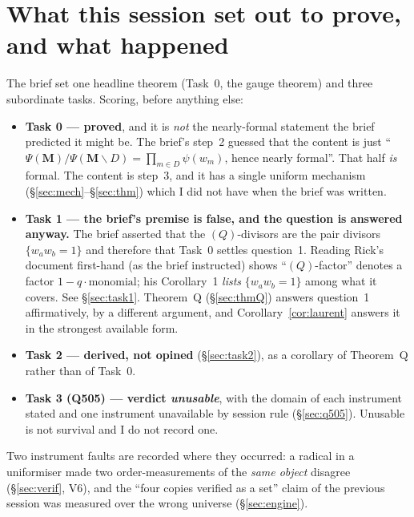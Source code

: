 \documentclass[11pt]{article}
\theoremstyle{definition}
\newcommand{\bM}{\mathbf{M}}
\newcommand{\sm}{\smallsetminus}
\begin{document}
\tableofcontents

\section{What this session set out to prove, and what happened}

The brief set one headline theorem (Task~0, the gauge theorem) and three
subordinate tasks.  Scoring, before anything else:

\begin{itemize}
\item \textbf{Task 0 --- proved}, and it is \emph{not} the nearly-formal statement
  the brief predicted it might be.  The brief's step~2 guessed that the content
  is just ``$\Psi(\bM)/\Psi(\bM\sm D)=\prod_{m\in D}\psi(w_m)$, hence nearly
  formal''.  That half \emph{is} formal.  The content is step~3, and it has a
  single uniform mechanism (\S\ref{sec:mech}--\S\ref{sec:thm}) which I did not
  have when the brief was written.
\item \textbf{Task 1 --- the brief's premise is false, and the question is
  answered anyway.}  The brief asserted that the $(Q)$-divisors are the pair
  divisors $\{w_aw_b=1\}$ and therefore that Task~0 settles question~1.  Reading
  Rick's document first-hand (as the brief instructed) shows ``$(Q)$-factor''
  denotes a factor $1-q\cdot\text{monomial}$; his Corollary~1 \emph{lists}
  $\{w_aw_b=1\}$ among what it covers.  See \S\ref{sec:task1}.  Theorem~Q
  (\S\ref{sec:thmQ}) answers question~1 affirmatively, by a different argument,
  and Corollary~\ref{cor:laurent} answers it in the strongest available form.
\item \textbf{Task 2 --- derived, not opined} (\S\ref{sec:task2}), as a corollary
  of Theorem~Q rather than of Task~0.
\item \textbf{Task 3 (Q505) --- verdict \emph{unusable}}, with the domain of each
  instrument stated and one instrument unavailable by session rule
  (\S\ref{sec:q505}).  Unusable is not survival and I do not record one.
\end{itemize}

\noindent
Two instrument faults are recorded where they occurred: a radical in a
uniformiser made two order-measurements of the \emph{same object} disagree
(\S\ref{sec:verif}, V6), and the ``four copies verified as a set'' claim of the
previous session was measured over the wrong universe
(\S\ref{sec:engine}).
\end{document}
